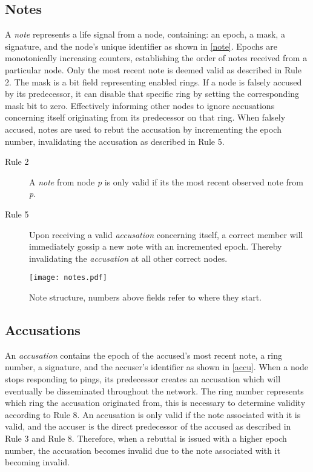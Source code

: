 \documentclass[USenglish]{uit-thesis}
\begin{document}
\subsection{Notes}
A \textit{note} represents a life signal from a node, containing: an epoch, a mask, a signature, and the node's unique identifier as shown in \autoref{note}.
Epochs are monotonically increasing counters, establishing the order of notes received from a particular node.
Only the most recent note is deemed valid as described in Rule 2.
The mask is a bit field representing enabled rings. 
If a node is falsely accused by its predecessor, it can disable that specific ring by setting the corresponding mask bit to zero. 
Effectively informing other nodes to ignore accusations concerning itself originating from its predecessor on that ring.
When falsely accused, notes are used to rebut the accusation by incrementing the epoch number, invalidating the accusation as described in Rule 5.

\begin{description}
\item[Rule 2] A \textit{note} from node \textit{p} is only valid if its the most recent observed note from \textit{p}.
\item[Rule 5] Upon receiving a valid \textit{accusation} concerning itself, a correct member will immediately gossip a new note with an incremented epoch.
Thereby invalidating the \textit{accusation} at all other correct nodes.
\end{description}


\begin{figure}[h]
	\centering
	\texttt{[image: notes.pdf]}
	\caption{Note structure, numbers above fields refer to where they start.}
	\label{note}
\end{figure}


\subsection{Accusations}
An \textit{accusation} contains the epoch of the accused's most recent note, a ring number, a signature, and the accuser's identifier as shown in \autoref{accu}.
When a node stops responding to pings, its predecessor creates an accusation which will eventually be disseminated throughout the network.
The ring number represents which ring the accusation originated from, this is necessary to determine validity according to Rule 8.
An accusation is only valid if the note associated with it is valid, and the accuser is the direct predecessor of the accused as described in Rule 3 and Rule 8. 
Therefore, when a rebuttal is issued with a higher epoch number, the accusation becomes invalid due to the note associated with it becoming invalid.
\end{document}
